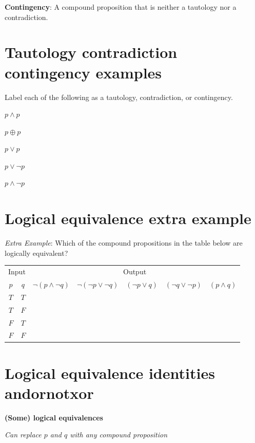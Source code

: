 \documentclass[12pt, oneside]{article}
\begin{document}
{\bf Contingency}: A compound proposition that is neither a tautology nor a contradiction.
 \vfill
\section*{Tautology contradiction contingency examples}


Label each of the following as a tautology, contradiction, or contingency.

$p \land p$

\vfill

$p \oplus p$

\vfill

$p \lor p$

\vfill

$p \lor \lnot p$

\vfill

$p \land \lnot p$

\vfill

 \vfill
\section*{Logical equivalence extra example}


{\it Extra Example}: Which of the  compound propositions in the table below are logically equivalent?
\begin{center}
\begin{tabular}{cc||c|c|c|c|c}
\multicolumn{2}{c||}{Input}  & \multicolumn{5}{c}{Output} \\
$p$ & $q$ & $\lnot (p \land \lnot q)$ & $\lnot (\lnot p  \lor \lnot q)$ &  $(\lnot p \lor  q)$
& $(\lnot q \lor \lnot p)$ & $(p \land q)$  \\
\hline
$T$ & $T$ & &&&&\\
$T$ & $F$ & &&&&\\
$F$ & $T$ & &&&&\\
$F$ & $F$ & &&&&\\
\end{tabular}
\end{center} \vfill
\section*{Logical equivalence identities andornotxor}


{\bf (Some) logical equivalences}

{\it Can replace $p$ and $q$ with any compound proposition}
\end{document}
